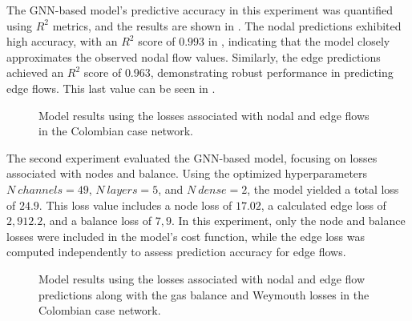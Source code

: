 The GNN-based model's predictive accuracy in this experiment was quantified using \( R^2 \) metrics, and the results are shown in . The nodal predictions exhibited high accuracy, with an \( R^2 \) score of \( 0.993 \) in , indicating that the model closely approximates the observed nodal flow values. Similarly, the edge predictions achieved an \( R^2 \) score of \( 0.963 \), demonstrating robust performance in predicting edge flows. This last value can be seen in .


\begin{figure}[htbp]
    \centering
    \setlength{}        
    \setlength{} 
    
    \caption{Model results using the losses associated with nodal and edge flows in the Colombian case network.}
    \label{fig:col_base_f_results_non_lineal}
\end{figure}


The second experiment evaluated the GNN-based model, focusing on losses associated with nodes and balance. Using the optimized hyperparameters \( N \ channels = 49 \), \( N \ layers = 5 \), and \( N \ dense = 2 \), the model yielded a total loss of \( 24.9 \). This loss value includes a node loss of \( 17.02 \), a calculated edge loss of \( 2,912.2 \), and a balance loss of \( 7,9 \). In this experiment, only the node and balance losses were included in the model's cost function, while the edge loss was computed independently to assess prediction accuracy for edge flows.


\begin{figure}[htbp]
    \centering
    \setlength{}        
    \setlength{} 
    
    \caption{Model results using the losses associated with nodal and edge flow predictions along with the gas balance and Weymouth losses in the Colombian case network.}
    \label{fig:col_base_bal_results_non_lineal}
\end{figure}



